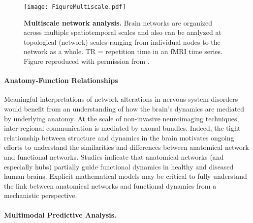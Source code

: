 \documentclass[12pt]{article}
\begin{document}
 \begin{figure}[h!]
	\centerline{\texttt{[image: FigureMultiscale.pdf]}}
	\caption{\textbf{Multiscale network analysis.} Brain networks are organized across multiple spatiotemporal scales and also can be analyzed at topological (network) scales ranging from individual nodes to the network as a whole. TR = repetition time in an fMRI time series. Figure reproduced with permission from \cite{betzel2016multi}.}
	\label{fig:multiscale}
	\centering
\end{figure}


\paragraph*{Anatomy-Function Relationships}

Meaningful interpretations of network alterations in nervous system disorders would benefit from an understanding of how the brain's dynamics are mediated by underlying anatomy. At the scale of non-invasive neuroimaging techniques, inter-regional communication is mediated by axonal bundles. Indeed, the tight relationship between structure and dynamics in the brain motivates ongoing efforts to understand the similarities and differences between anatomical network and functional networks. Studies indicate that anatomical networks (and especially hubs) partially guide functional dynamics in healthy \cite{honey2010can,hermundstad2013structural} and diseased \cite{liao2013relationship,vaessen2014functional,zhang2011altered} human brains. Explicit mathematical models may be critical to fully understand the link between anatomical networks and functional dynamics from a mechanistic perspective. 



\paragraph{Multimodal Predictive Analysis.}
\end{document}
